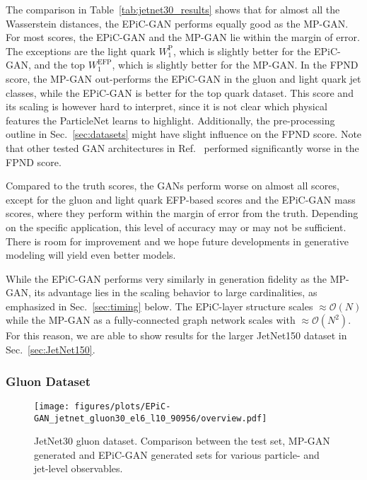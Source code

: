 \documentclass[a4paper,submission, Phys]{SciPost}
\DeclareRobustCommand{\Sec}[1]{Sec.~\ref{sec:#1}}
\DeclareRobustCommand{\Tab}[1]{Table~\ref{tab:#1}}
\DeclareRobustCommand{\Reff}[1]{Ref.~\cite{#1}}
\begin{document}
The comparison in \Tab{jetnet30_results} shows that for almost all the Wasserstein distances, the EPiC-GAN performs equally good as the MP-GAN. 
%
For most scores, the EPiC-GAN and the MP-GAN lie within the margin of error.
%
The exceptions are the light quark $W_1^\mathrm{P}$, which is slightly better for the EPiC-GAN, and the top $W_1^\mathrm{EFP}$, which is slightly better for the MP-GAN.
%
In the FPND score, the MP-GAN out-performs the EPiC-GAN in the gluon and light quark jet classes, while the EPiC-GAN is better for the top quark dataset. 
%
This score and its scaling is however hard to interpret, since it is not clear which physical features the ParticleNet learns to highlight. 
%
Additionally, the pre-processing outline in \Sec{datasets} might have slight influence on the FPND score. 
%
Note that other tested GAN architectures in \Reff{MPGAN} performed significantly worse in the FPND score. 


Compared to the truth scores, the GANs perform worse on almost all scores, except for the gluon and light quark EFP-based scores and the EPiC-GAN mass scores, where they perform within the margin of error from the truth.
%
Depending on the specific application, this level of accuracy may or may not be sufficient. 
%
There is room for improvement and we hope future developments in generative modeling will yield even better models. 


While the EPiC-GAN performs very similarly in generation fidelity as the MP-GAN, its advantage lies in the scaling behavior to large cardinalities, as emphasized in \Sec{timing} below. 
%
The EPiC-layer structure scales $\approx \mathcal{O}(N)$ while the MP-GAN as a fully-connected graph network scales with $\approx \mathcal{O}(N^2)$.
%
For this reason, we are able to show results for the larger JetNet150 dataset in \Sec{JetNet150}.

\subsubsection{Gluon Dataset}


\begin{figure}[tbp]
\centering
\texttt{[image: figures/plots/EPiC-GAN\_jetnet\_gluon30\_el6\_l10\_90956/overview.pdf]}
\caption{JetNet30 gluon dataset. Comparison between the test set, MP-GAN generated and EPiC-GAN generated sets for various particle- and jet-level observables.
}
\label{fig:JetNet30_gluon}
\end{figure}
\end{document}
